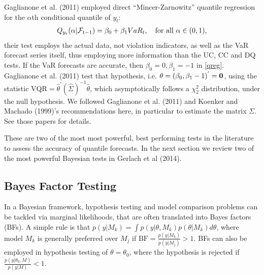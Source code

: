 \documentclass[12pt,epsf]{article}
\newcommand{\calF}{{\cal F}}
\begin{document}
Gaglianone et al. (2011) employed direct ``Mincer-Zarnowitz'' quantile regression for the $\alpha$th conditional quantile of $y_t$:
\begin{eqnarray}\label{qreg}
Q_{y_t } (\alpha |\calF_{t-1}  ) = \beta_0  + \beta_1 VaR_t, \quad{\textrm{for all }}\alpha  \in {\rm{(0,1)}},
\end{eqnarray}
their test employs the actual data, not violation indicators, as well as the VaR forecast series itself, thus employing more information
than the UC, CC and DQ tests. If the VaR forecasts are accurate, then $\beta _0  = 0, \beta _1  = -1$ in \ref{qreg}. Gaglianone et al. (2011)
test that hypothesis, i.e. $\theta= (\beta_0, \beta_1-1)^{'} = \bf{0}$, using the statistic
$\mbox{VQR} = \hat{\theta}^{'} \left(\hat{\Sigma} \right)^{-1} \hat{\theta}$,
which asymptotically follows a $\chi^2_2$ distribution, under the null hypothesis. We followed Gaglianone et al. (2011) and Koenker and
Machado (1999)'s recommendations here, in particular to estimate the matrix $\Sigma$. See those papers for details.

These are two of the most most powerful, best performing tests in the literature to assess the accuracy of quantile forecasts. In the next
section we review two of the most powerful Bayesian tests in Gerlach et al (2014).

\subsection{Bayes Factor Testing}
In a Bayesian framework, hypothesis testing and model comparison problems can be tackled via marginal likelihoods, that are often
translated into Bayes factors (BFs). A simple rule is that
$ p(y|M_k) = \int p(y|\theta, M_k) p(\theta | M_k) d \theta $, where model $M_k$ is generally preferred over $M_j$ if
$\mbox{BF} =\frac{p(y| M_k)}{p(y|M_j)} > 1$. BFs can also be employed in hypothesis testing of $\theta= \theta_0$,
where the hypothesis is rejected if $\frac{p(y|\theta_0, M)}{p(y|M)} < 1$.
\end{document}
